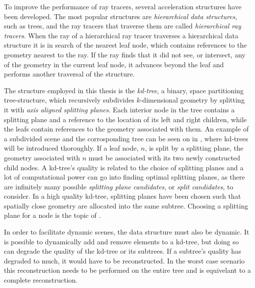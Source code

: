
To improve the performance of ray tracers, several acceleration
structures have been developed. The most popular structures are
\textit{hierarchical data structures}, such as trees, and the ray
tracers that traverse them are called \textit{hierarchical ray
  tracers}. When the ray of a hierarchical ray tracer traverses a
hierarchical data structure it is in search of the nearest leaf node,
which contains references to the geometry nearest to the ray. If the
ray finds that it did not see, or intersect, any of the geometry in
the current leaf node, it advances beyond the leaf and performs
another traversal of the structure.

The structure employed in this thesis is the \textit{kd-tree}, a binary, space
partitioning tree-structure, which recursively subdivides $k$-dimensional
geometry by splitting it with \textit{axis aligned splitting planes}. Each
interior node in the tree contains a splitting plane and a reference to the
location of its left and right children, while the leafs contain references to
the geometry associated with them. An example of a subdivided scene and the
corrosponding tree can be seen on  in
, where kd-trees will be introduced thoroughly. If a
leaf node, $n$, is split by a splitting plane, the geometry associated with $n$
must be associated with its two newly constructed child nodes. A kd-tree's
quality is related to the choice of splitting planes and a lot of computational
power can go into finding optimal splitting planes, as there are infinitely many
possible \textit{splitting plane candidates}, or \textit{split candidates}, to
consider. In a high quality kd-tree, splitting planes have been chosen such that
spatially close geometry are allocated into the same subtree. Choosing a
splitting plane for a node is the topic of . 

In order to facilitate dynamic scenes, the data structure must also be
dynamic. It is possible to dynamically add and remove elements to a kd-tree, but
doing so can degrade the quality of the kd-tree or its subtrees. If a subtree's
quality has degraded to much, it would have to be reconstructed. In the worst
case scenario this reconstruction needs to be performed on the entire tree and
is equivelant to a complete reconstruction. 


